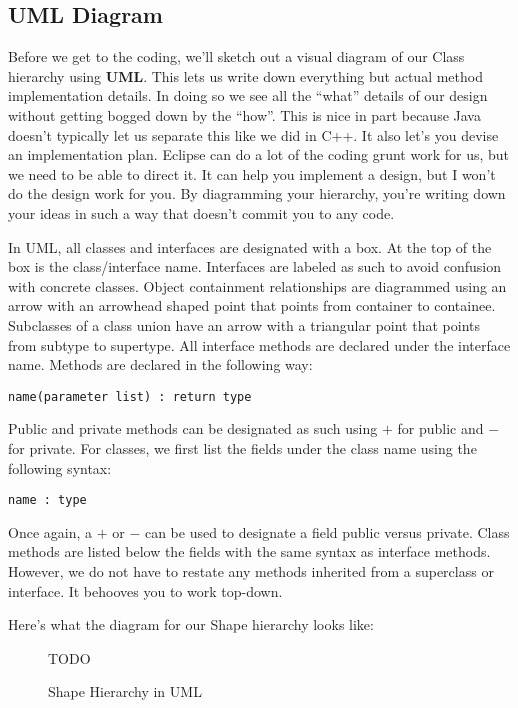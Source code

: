 \documentclass[]{tufte-handout}
\begin{document}
\subsection{UML Diagram}

Before we get to the coding, we'll sketch out a visual diagram of our Class hierarchy using \textbf{UML}. This lets us write down everything but actual method implementation details. In doing so we see all the ``what'' details of our design without getting bogged down by the ``how''.  This is nice in part because Java doesn't typically let us separate this like we did in C++.  It also let's you devise an implementation plan.  Eclipse can do a lot of the coding grunt work for us, but we need to be able to direct it. It can help you implement a design, but I won't do the design work for you. By diagramming your hierarchy, you're writing down your ideas in such a way that doesn't commit you to any code.

In UML, all classes and interfaces are designated with a box. At the top of the box is the class/interface name. Interfaces are labeled as such to avoid confusion with concrete classes. Object containment relationships are diagrammed using an arrow with an arrowhead shaped point that points from container to containee. Subclasses of a class union have an arrow with a triangular point that points from subtype to supertype. 
All interface methods are declared under the interface name. Methods are declared in the following way:
\begin{verbatim}
name(parameter list) : return type
\end{verbatim}
Public and private methods can be designated as such using $+$ for public and $-$ for private. For classes, we first list the fields under the class name using the following syntax:
\begin{verbatim}
name : type
\end{verbatim}
Once again, a $+$ or $-$ can be used to designate a field public versus private. Class methods are listed below the fields with the same syntax as interface methods. However, we do not have to restate any methods inherited from a superclass or interface. It behooves you to work top-down. 

Here's what the diagram for our Shape hierarchy looks like:
\begin{figure}
TODO
\caption{Shape Hierarchy in UML}
\end{figure}
\end{document}
